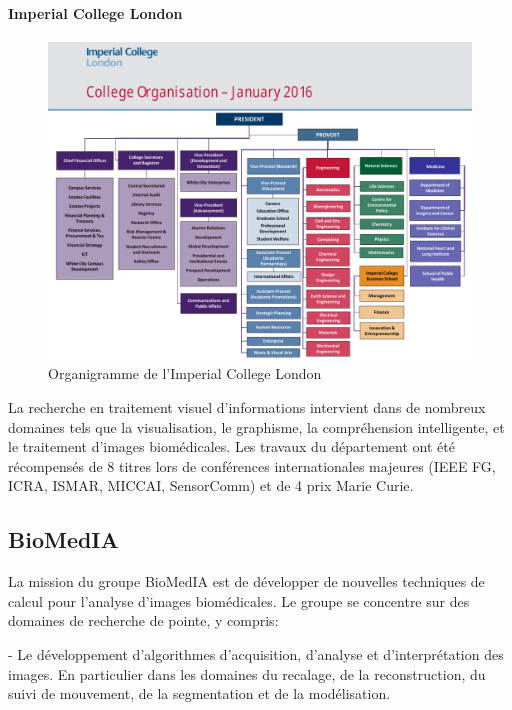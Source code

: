 \documentclass[10pt]{report}
\begin{document}
	\paragraph{Imperial College London}
		\begin{figure}[h!]
			\begin{center}
				\includegraphics[width=16cm]{Reports/figures/College-Organisation.pdf}
			\end{center}	
			\caption{Organigramme de l'Imperial College London}
			\label{Organigramme de l'Imperial College London}
		\end{figure}
	La recherche en traitement visuel d'informations intervient dans de nombreux domaines tels que la visualisation, le graphisme, la compréhension intelligente, et le traitement d'images biomédicales.  
	Les travaux du département ont été récompensés de 8 titres lors de conférences internationales majeures (IEEE FG, ICRA, ISMAR, MICCAI, SensorComm) et de 4 prix Marie Curie.
	

	
	\subsection{BioMedIA}
	
	La mission du groupe BioMedIA est de développer de nouvelles techniques de
	calcul pour l'analyse d'images biomédicales. Le groupe se concentre sur des
	domaines de recherche de pointe, y compris:

	- Le développement d'algorithmes d'acquisition, d'analyse et d'interprétation
	des images. En particulier dans les domaines du recalage, de la reconstruction,
	du suivi de mouvement, de la segmentation et de la modélisation.
\end{document}
